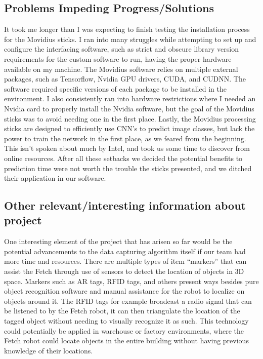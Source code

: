 \documentclass[draftclsnofoot, onecolumn, 10pt, compsoc]{IEEEtran}
\begin{document}
\subsection{Problems Impeding Progress/Solutions}

It took me longer than I was expecting to finish testing the installation process for the Movidius sticks. I ran into many struggles while attempting to set up and configure the interfacing software, such as strict and obscure library version requirements for the custom software to run, having the proper hardware available on my machine. The Movidius software relies on multiple external packages, such as Tensorflow, Nvidia GPU drivers, CUDA, and CUDNN. The software required specific versions of each package to be installed in the environment. I also consistently ran into hardware restrictions where I needed an Nvidia card to properly install the Nvidia software, but the goal of the Movidius sticks was to avoid needing one in the first place. Lastly, the Movidius processing sticks are designed to efficiently use CNN’s to predict image classes, but lack the power to train the network in the first place, as we feared from the beginning. This isn’t spoken about much by Intel, and took us some time to discover from online resources. After all these setbacks we decided the potential benefits to prediction time were not worth the trouble the sticks presented, and we ditched their application in our software. 

\subsection{Other relevant/interesting information about project}

One interesting element of the project that has arisen so far would be the potential advancements to the data capturing algorithm itself if our team had more time and resources. There are multiple types of item “markers” that can assist the Fetch through use of sensors to detect the location of objects in 3D space. Markers such as AR tags, RFID tags, and others present ways besides pure object recognition software and manual assistance for the robot to localize on objects around it. The RFID tags for example broadcast a radio signal that can be listened to by the Fetch robot, it can then triangulate the location of the tagged object without needing to visually recognize it as such. This technology could potentially be applied in warehouse or factory environments, where the Fetch robot could locate objects in the entire building without having previous knowledge of their locations. 
\end{document}
